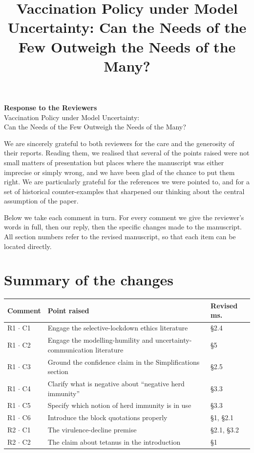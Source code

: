 \documentclass[a4paper,12pt]{article}
\title{Vaccination Policy under Model Uncertainty: Can the Needs of the Few Outweigh the Needs of the Many? }
\author{}
\begin{document}
\begin{center}
{\Large\bf Response to the Reviewers}\\[0.6em]
{\large Vaccination Policy under Model Uncertainty:\\ Can the Needs of the Few Outweigh the Needs of the Many?}
\end{center}

\bigskip

\noindent We are sincerely grateful to both reviewers for the care and the
generosity of their reports. Reading them, we realised that several of the
points raised were not small matters of presentation but places where the
manuscript was either imprecise or simply wrong, and we have been glad of the
chance to put them right. We are particularly grateful for the references we
were pointed to, and for a set of historical counter-examples that sharpened
our thinking about the central assumption of the paper.

\medskip

\noindent Below we take each comment in turn. For every comment we give the
reviewer's words in full, then our reply, then the specific changes made to
the manuscript. All section numbers refer to the revised manuscript, so that
each item can be located directly.

\bigskip

\section*{Summary of the changes}

\noindent\begin{tabularx}{\textwidth}{|l|X|l|}
\hline
{\bf Comment} & {\bf Point raised} & {\bf Revised ms.}\\\hline
R1 $\cdot$ C1 & Engage the selective-lockdown ethics literature & \S2.4\\\hline
R1 $\cdot$ C2 & Engage the modelling-humility and uncertainty-communication literature & \S5\\\hline
R1 $\cdot$ C3 & Ground the confidence claim in the Simplifications section & \S2.5\\\hline
R1 $\cdot$ C4 & Clarify what is negative about ``negative herd immunity'' & \S3.3\\\hline
R1 $\cdot$ C5 & Specify which notion of herd immunity is in use & \S3.3\\\hline
R1 $\cdot$ C6 & Introduce the block quotations properly & \S1, \S2.1\\\hline
R2 $\cdot$ C1 & The virulence-decline premise & \S2.1, \S3.2\\\hline
R2 $\cdot$ C2 & The claim about tetanus in the introduction & \S1\\\hline
\end{tabularx}
\end{document}

